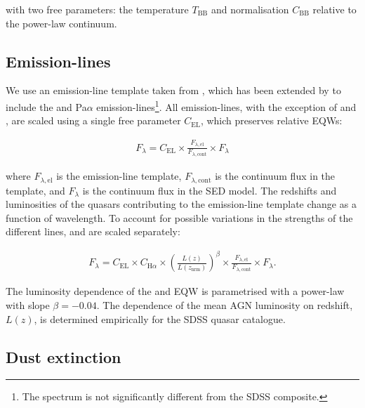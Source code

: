 \noindent with two free parameters: the temperature $T_{\text{BB}}$ and normalisation $C_{\text{BB}}$ relative to the power-law continuum. 

\subsection{Emission-lines}

We use an emission-line template taken from \citet{francis91}, which has been extended by \citet{maddox06} to include the \ha and Pa$\alpha$ emission-lines\footnote{The spectrum is not significantly different from the \citet{vandenberk01} SDSS composite.}. 
All emission-lines, with the exception of \ha and \hbns, are scaled using a single free parameter $C_{\text{EL}}$, which preserves relative EQWs:

\begingroup\makeatletter{}\check@mathfonts
\begin{eqnarray}
  F_{\lambda} =  C_{\text{EL}} \times \frac{F_{\lambda, \text{el}}}{F_{\lambda, \text{cont}}} \times F_{\lambda} 
\end{eqnarray} 
\endgroup

\noindent where $F_{\lambda, \text{el}}$ is the emission-line template, $F_{\lambda,\text{cont}}$ is the continuum flux in the template, and $F_{\lambda}$ is the continuum flux in the SED model.
The redshifts and luminosities of the quasars contributing to the emission-line template change as a function of wavelength. 
To account for possible variations in the strengths of the different lines, \ha and \hb are scaled separately: 

\begingroup\makeatletter{}\check@mathfonts
\begin{eqnarray}
  F_{\lambda} =  C_{\text{EL}} \times C_{{\text{H}} \alpha} \times \left( \frac{L(z)} {L(z_{\text{nrm}})} \right)^{\beta} \times \frac{F_{\lambda, \text{el}}}{F_{\lambda, \text{cont}}} \times F_{\lambda}.
\end{eqnarray}
\endgroup

\noindent The luminosity dependence of the \ha and \hb EQW \citep[i.e. the Baldwin effect;][]{baldwin77} is parametrised with a power-law with slope $\beta=-0.04$.
The dependence of the mean AGN luminosity on redshift, $L(z)$, is determined empirically for the SDSS quasar catalogue. 

\subsection{Dust extinction}
\label{sec:sed-extinction} 


